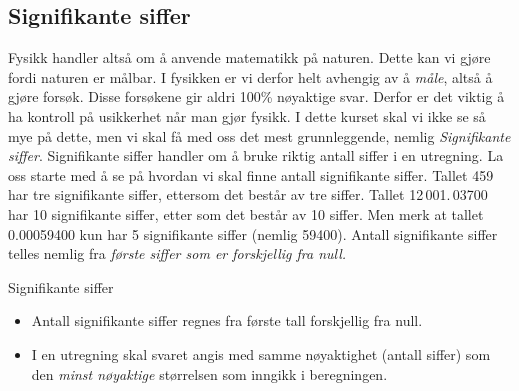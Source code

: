 \subsection{Signifikante siffer}
Fysikk handler altså om å anvende matematikk på naturen. Dette kan vi gjøre fordi naturen er målbar. I fysikken er vi derfor helt avhengig av å \textit{måle}, altså å gjøre forsøk. Disse forsøkene gir aldri 100\% nøyaktige svar. Derfor er det viktig å ha kontroll på usikkerhet når man gjør fysikk. I dette kurset skal vi ikke se så mye på dette, men vi skal få med oss det mest grunnleggende, nemlig \textit{Signifikante siffer}. Signifikante siffer handler om å bruke riktig antall siffer i en utregning. La oss starte med å se på hvordan vi skal finne antall signifikante siffer. Tallet 459 har tre signifikante siffer, ettersom det består av tre siffer. Tallet 12\,001.\,03700 har 10 signifikante siffer, etter som det består av 10 siffer. 
Men merk at tallet 0.00059400 kun har 5 signifikante siffer (nemlig 59400). Antall signifikante siffer telles nemlig fra \textit{første siffer som er forskjellig fra null.}

\begin{myoppsum*}{Signifikante siffer}
    \begin{itemize}
        \item Antall signifikante siffer regnes fra første tall forskjellig fra null. 
        \item I en utregning skal svaret angis med samme nøyaktighet (antall siffer) som den \textit{minst nøyaktige} størrelsen som inngikk i beregningen.
    \end{itemize}
\end{myoppsum*}


